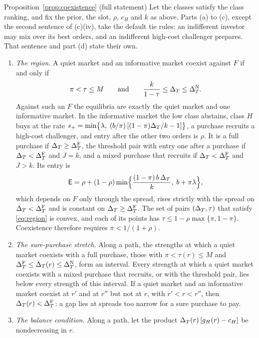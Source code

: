 \begin{named}{Proposition~\ref{prop:coexistence} (full statement)}
Let the classes satisfy the class ranking, and fix the prior, the slot, \(\rho\), \(c_H\) and \(k\) as above. Parts
(a) to (c), except the second sentence of (c)(iv), take the default tie rules: an indifferent investor may mix over
its best orders, and an indifferent high-cost challenger prepares. That sentence and part (d) state their own.
\begin{enumerate}[label=(\alph*),leftmargin=2em]
\item \emph{The region.} A quiet market and an informative market coexist against \(F\) if and only if
\begin{equation}\label{eq:region}
\pi<\tau\le M\qquad\text{and}\qquad \frac{k}{1-\tau}\le\Delta_T\le\Delta_T^{\rm N} .
\end{equation}
Against such an \(F\) the equilibria are exactly the quiet market and one informative market. In the informative
market the low class abstains, class \(H\) buys at the rate
\(s_+=\min\bigl\{\lambda,\;(b/\pi)\,[(1-\pi)\Delta_T/k-1]\bigr\}\), a purchase recruits a high-cost challenger, and entry
after the other two orders is \(\rho\). It is a full purchase if \(\Delta_T\ge\Delta_T^{\rm F}\), the threshold pair with entry
one after a purchase if \(\Delta_T<\Delta_T^{\rm F}\) and \(J=k\), and a mixed purchase that recruits if \(\Delta_T<\Delta_T^{\rm F}\) and
\(J>k\). Its entry is
\begin{equation}\label{eq:entry-inf}
\mathsf{E}=\rho+(1-\rho)\min\Bigl\{\frac{(1-\pi)\,b\,\Delta_T}{k},\;b+\pi\lambda\Bigr\},
\end{equation}
which depends on \(F\) only through the spread, rises strictly with the spread on \(\Delta_T<\Delta_T^{\rm F}\) and is constant
on \(\Delta_T\ge\Delta_T^{\rm F}\). The set of pairs \((\Delta_T,\tau)\) that satisfy \eqref{eq:region} is convex, and each of its
points has \(\tau\le1-\rho\max\{\pi,1-\pi\}\). Coexistence therefore requires \(\pi<1/(1+\rho)\).
\item \emph{The sure-purchase stretch.} Along a path, the strengths at which a quiet market coexists with a full
purchase, those with \(\pi<\tau(r)\le M\) and \(\Delta_T^{\rm F}\le\Delta_T(r)\le\Delta_T^{\rm N}\), form an interval. Every strength at
which a quiet market coexists with a mixed purchase that recruits, or with the threshold pair, lies below every
strength of this interval. If a quiet market and an informative market coexist at \(r'\) and at \(r''\) but not at
\(r\), with \(r'<r<r''\), then \(\Delta_T(r)<\Delta_T^{\rm F}\): a gap lies at spreads too narrow for a sure purchase to pay.
\item \emph{The balance condition.} Along a path, let the product \(\Delta_T(r)\,[g_H(r)-c_H]\) be nondecreasing in \(r\).

\end{enumerate}
\end{named}
